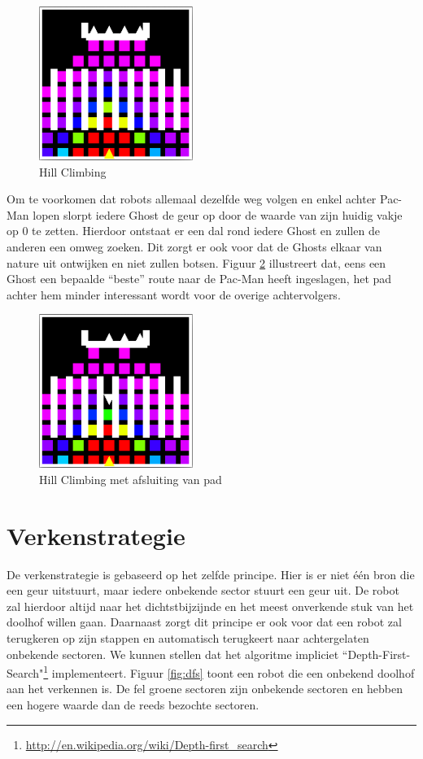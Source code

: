 \documentclass[12pt,a4paper]{report}
\begin{document}
\begin{figure}[htbp]
  \centering
  \includegraphics[width=50mm]{resources/hillclimbing1.png}
  \caption{Hill Climbing}
  \label{fig:hillclimbing1}
\end{figure}

Om te voorkomen dat robots allemaal dezelfde weg volgen en enkel achter Pac-Man lopen slorpt iedere Ghost de geur op door de waarde van zijn huidig vakje op 0 te zetten. Hierdoor ontstaat er een dal rond iedere Ghost en zullen de anderen een omweg zoeken. Dit zorgt er ook voor dat de Ghosts elkaar van nature uit ontwijken en niet zullen botsen. Figuur \ref{fig:hillclimbing2} illustreert dat, eens een Ghost een bepaalde ``beste'' route naar de Pac-Man heeft ingeslagen, het pad achter hem minder interessant wordt voor de overige achtervolgers.

\begin{figure}[htbp]
  \centering
  \includegraphics[width=50mm]{resources/hillclimbing2.png}
  \caption{Hill Climbing met afsluiting van pad}
  \label{fig:hillclimbing2}
\end{figure}

\section{Verkenstrategie}

De verkenstrategie is gebaseerd op het zelfde principe. Hier is er niet \'e\'en bron die een geur uitstuurt, maar iedere onbekende sector stuurt een geur uit. De robot zal hierdoor altijd naar het dichtstbijzijnde en het meest onverkende stuk van het doolhof willen gaan. Daarnaast zorgt dit principe er ook voor dat een robot zal terugkeren op zijn stappen en automatisch terugkeert naar achtergelaten onbekende sectoren. We kunnen stellen dat het algoritme impliciet ``Depth-First-Search"\footnote{\url{http://en.wikipedia.org/wiki/Depth-first_search}} implementeert. Figuur \ref{fig:dfs} toont een robot die een onbekend doolhof aan het verkennen is. De fel groene sectoren zijn onbekende sectoren en hebben een hogere waarde dan de reeds bezochte sectoren.
\end{document}

